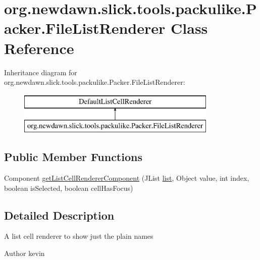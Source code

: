 \hypertarget{classorg_1_1newdawn_1_1slick_1_1tools_1_1packulike_1_1_packer_1_1_file_list_renderer}{}\section{org.\+newdawn.\+slick.\+tools.\+packulike.\+Packer.\+File\+List\+Renderer Class Reference}
\label{classorg_1_1newdawn_1_1slick_1_1tools_1_1packulike_1_1_packer_1_1_file_list_renderer}
Inheritance diagram for org.\+newdawn.\+slick.\+tools.\+packulike.\+Packer.\+File\+List\+Renderer\+:\begin{figure}[H]
\begin{center}
\leavevmode
\includegraphics[height=2.000000cm]{classorg_1_1newdawn_1_1slick_1_1tools_1_1packulike_1_1_packer_1_1_file_list_renderer}
\end{center}
\end{figure}
\subsection*{Public Member Functions}
\begin{DoxyCompactItemize}
\item 
Component \mbox{\hyperlink{classorg_1_1newdawn_1_1slick_1_1tools_1_1packulike_1_1_packer_1_1_file_list_renderer_aa76e4932237103da9a918ad018944795}{get\+List\+Cell\+Renderer\+Component}} (J\+List \mbox{\hyperlink{classorg_1_1newdawn_1_1slick_1_1tools_1_1packulike_1_1_packer_a45e8438e951eb84f2efaf06e5ae481bd}{list}}, Object value, int index, boolean is\+Selected, boolean cell\+Has\+Focus)
\end{DoxyCompactItemize}


\subsection{Detailed Description}
A list cell renderer to show just the plain names

\begin{DoxyAuthor}{Author}
kevin 
\end{DoxyAuthor}


